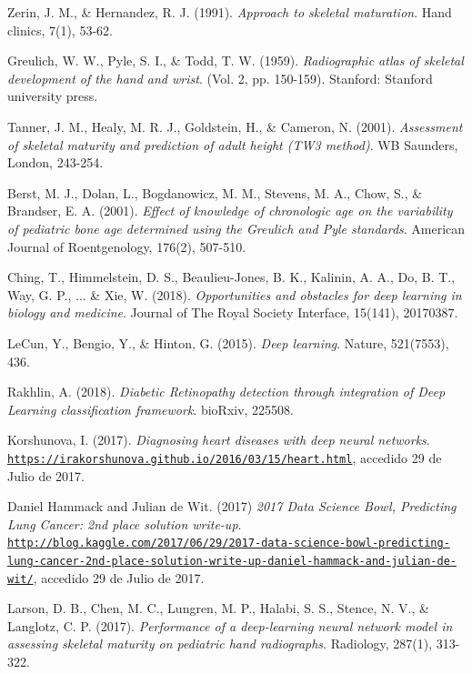 \documentclass[conference]{IEEEtran}
\begin{document}
\begin{thebibliography}{00}
Zerin, J. M., \& Hernandez, R. J. (1991). 
\textit{Approach to skeletal maturation}. 
Hand clinics, 7(1), 53-62.

Greulich, W. W., Pyle, S. I., \& Todd, T. W. (1959).
\textit{Radiographic atlas of skeletal development of the hand and wrist}. 
(Vol. 2, pp. 150-159). Stanford: Stanford university press.

Tanner, J. M., Healy, M. R. J., Goldstein, H., \& Cameron, N. (2001).
\textit{Assessment of skeletal maturity and prediction of adult height (TW3 method)}. 
WB Saunders, London, 243-254.

Berst, M. J., Dolan, L., Bogdanowicz, M. M., Stevens, M. A., Chow, S., \& Brandser, E. A. (2001).
\textit{Effect of knowledge of chronologic age on the variability of pediatric bone age determined using the Greulich and Pyle standards}. 
American Journal of Roentgenology, 176(2), 507-510.

Ching, T., Himmelstein, D. S., Beaulieu-Jones, B. K., Kalinin, A. A., Do, B. T., Way, G. P., ... \& Xie, W. (2018).
\textit{Opportunities and obstacles for deep learning in biology and medicine}.
Journal of The Royal Society Interface, 15(141), 20170387.

LeCun, Y., Bengio, Y., \& Hinton, G. (2015).
\textit{Deep learning}.
Nature, 521(7553), 436.

Rakhlin, A. (2018).
\textit{Diabetic Retinopathy detection through integration of Deep Learning classification framework}.
bioRxiv, 225508.

Korshunova, I. (2017).
\textit{Diagnosing heart diseases with deep neural networks}.
\\\texttt{\url{https://irakorshunova.github.io/2016/03/15/heart.html}}, accedido 29 de Julio de 2017.

Daniel Hammack and Julian de Wit. (2017)
\textit{2017 Data Science Bowl, Predicting Lung Cancer: 2nd place solution write-up}.
\\\texttt{\url{http://blog.kaggle.com/2017/06/29/2017-data-science-bowl-predicting-lung-cancer-2nd-place-solution-write-up-daniel-hammack-and-julian-de-wit/}}, accedido 29 de Julio de 2017.

Larson, D. B., Chen, M. C., Lungren, M. P., Halabi, S. S., Stence, N. V., \& Langlotz, C. P. (2017).
\textit{Performance of a deep-learning neural network model in assessing skeletal maturity on pediatric hand radiographs}.
Radiology, 287(1), 313-322.


\end{thebibliography}
\end{document}
